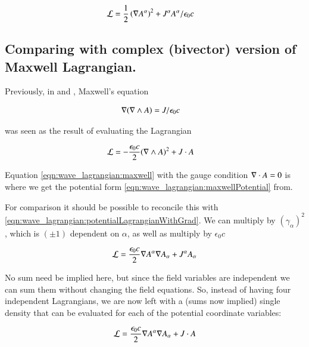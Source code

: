 \begin{align}\label{eqn:wave_lagrangian:potentialLagrangianWithGrad}
\mathcal{L} &= \frac{1}{2} \left( \nabla {A^\alpha} \right)^2 + J^\alpha A^\alpha / \epsilon_0 c
\end{align}

\subsection{Comparing with complex (bivector) version of Maxwell Lagrangian. }
Previously, in \citep{PJMaxwellLagrangian} and \citep{PJFieldLagrangian}, Maxwell's equation 

\begin{align}\label{eqn:wave_lagrangian:maxwell}
\nabla (\nabla \wedge A) &= J/ \epsilon_0 c
\end{align}

was seen as the result of evaluating the Lagrangian

\begin{align}\label{eqn:wave_lagrangian:maxlag}
\mathcal{L} &= -\frac{\epsilon_0 c}{2} (\nabla \wedge A)^2 + J \cdot A
\end{align}

Equation \ref{eqn:wave_lagrangian:maxwell} with the gauge condition $\nabla \cdot A = 0$
is where we get the potential form \ref{eqn:wave_lagrangian:maxwellPotential} from.

For comparison it should be possible to reconcile this with
\ref{eqn:wave_lagrangian:potentialLagrangianWithGrad}.  We can multiply by $(\gamma_\alpha)^2$, which is $(\pm 1)$ dependent on $\alpha$, as well as multiply by $\epsilon_0 c$

\begin{align*}
\mathcal{L} &= \frac{\epsilon_0 c}{2} \nabla {A^\alpha} \nabla {A_\alpha} + J^\alpha A_\alpha \\
\end{align*}

No sum need be implied here, but since the field variables are independent we can sum them without changing the field equations.  So, instead of having four independent Lagrangians, we are now left with a (sums now implied) single density that can be evaluated for each of the potential coordinate variables:

\begin{align*}
\mathcal{L} &= \frac{\epsilon_0 c}{2} \nabla {A^\alpha} \nabla {A_\alpha} + J \cdot A \\
\end{align*}


